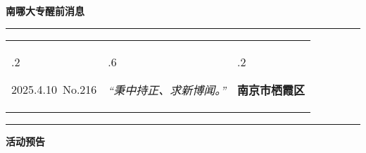 \documentclass[letterpaper, 12pt]{article}
\begin{document}
\begin{center}
    \Huge\textbf{南哪大专醒前消息}
\end{center}
\vspace{4mm}
\hrule
\renewcommand\tabularxcolumn[1]{m{#1}}
\begin{tabularx}{\textwidth}{>{\hsize.2\hsize}X>{\hsize.6\hsize}X>{\hsize.2\hsize}X}
    \begin{flushleft}
        2025.4.10\, No.216
    \end{flushleft}
    &
    \begin{center}
        \textit{“秉中持正、求新博闻。”}
    \end{center}
    &
    \begin{flushright}
        \textbf{南京市栖霞区}
    \end{flushright}
\end{tabularx}
\vspace{-3.5mm}
\hrule
\vspace{4mm}
\centerline{\huge\textbf{活动预告}}
\end{document}
